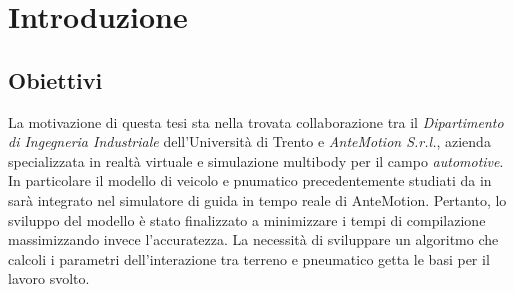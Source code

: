 \chapter{Introduzione}
\label{Introduzione}
%
\section{Obiettivi}
La motivazione di questa tesi sta nella trovata collaborazione tra il \textit{Dipartimento di Ingegneria Industriale} dell'Università di Trento e \textit{AnteMotion S.r.l.}, azienda specializzata in realtà virtuale e simulazione multibody per il campo \textit{automotive}. In particolare il modello di veicolo e pnumatico precedentemente studiati da \citeauthor{Larcher} in \cite{Larcher} sarà integrato nel simulatore di guida in tempo reale di AnteMotion. Pertanto, lo sviluppo del modello è stato finalizzato a minimizzare i tempi di compilazione massimizzando invece l'accuratezza. La necessità di sviluppare un algoritmo che calcoli i parametri dell'interazione tra terreno e pneumatico getta le basi per il lavoro svolto.
%
